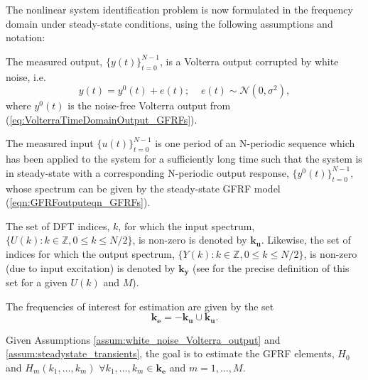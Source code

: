 The nonlinear system identification problem is now formulated in the frequency domain under steady-state conditions, using the following assumptions and notation: 
\begin{assum}
\label{assum:white_noise_Volterra_output}
The measured output, $\{y(t)\}_{t=0}^{N-1}$, is a Volterra output corrupted by white noise, i.e.
\begin{equation}
y(t) = y^0(t) + e(t); \; \; \; \; e(t) \sim \mathcal{N}(0,\sigma^2),
\label{eqn:VolterraWithNoise_transients}
\end{equation}
where $y^0(t)$ is the noise-free Volterra output from (\ref{eq:VolterraTimeDomainOutput_GFRFs}).
\end{assum}
\begin{assum}
The measured input $\{u(t)\}_{t=0}^{N-1}$ is one period of an N-periodic sequence which has been applied to the system for a sufficiently long time  such that the system is in steady-state with a corresponding N-periodic output response, $\{y^0(t)\}_{t=0}^{N-1}$, whose spectrum can be given by the steady-state GFRF model (\ref{eqn:GFRFoutputeqn_GFRFs}).
\label{assum:steadystate_transients}
\end{assum}
\begin{notation}
The set of DFT indices, $k$, for which the input spectrum, $\{U(k): k \in \mathbb{Z}, 0 \leq k \leq N/2\}$, is non-zero is denoted by $\mathbf{k_u}$. Likewise, the set of indices for which the output spectrum, $\{Y(k): k \in \mathbb{Z}, 0 \leq k \leq N/2\}$, is non-zero (due to input excitation) is denoted by $\mathbf{k_y}$ (see \cite{Lang1997} for the precise definition of this set for a given $U(k)$ and $M$).
\end{notation}
\begin{notation}
The frequencies of interest for estimation are given by the set \begin{equation} \mathbf{k_e} = -\mathbf{k_u} \cup \mathbf{k_u}. \end{equation}
\end{notation}
Given Assumptions \ref{assum:white_noise_Volterra_output} and \ref{assum:steadystate_transients}, the goal is to estimate the GFRF elements, $H_0$ and $H_m(k_1, \hdots,k_m)$ $\forall k_1, \hdots,k_m \in \mathbf{k_e}$ and $m = 1,\hdots,M$.

